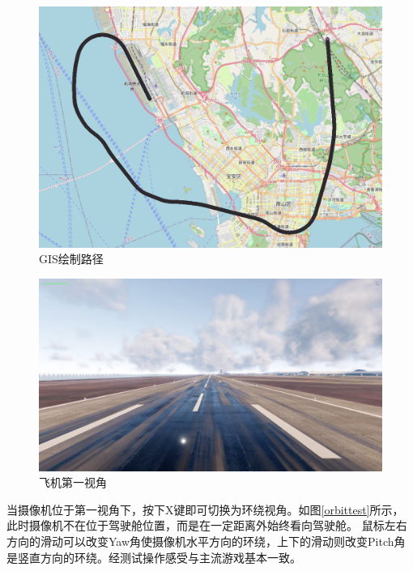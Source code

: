 \begin{figure}[h!]
    \begin{center}
        \includegraphics[width=.9\textwidth]{pictures/trace.png}
        \caption{GIS绘制路径}
        \label{GIStrace}
    \end{center}
\end{figure}
\begin{figure}[h!]
    \begin{center}
        \includegraphics[width=.9\textwidth]{pictures/firstcamera.png}
        \caption{飞机第一视角}
        \label{firsttest}
    \end{center}
\end{figure}
\par
当摄像机位于第一视角下，按下X键即可切换为环绕视角。如图\ref{orbittest}所示，此时摄像机不在位于驾驶舱位置，而是在一定距离外始终看向驾驶舱。
鼠标左右方向的滑动可以改变Yaw角使摄像机水平方向的环绕，上下的滑动则改变Pitch角是竖直方向的环绕。经测试操作感受与主流游戏基本一致。


